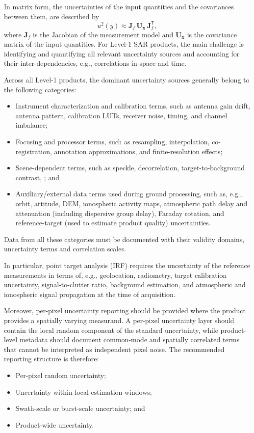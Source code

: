 In matrix form, the uncertainties of the input quantities and the covariances
between them, are described by
\begin{equation}
  u^{2}(y) \approx \mathbf{J}_{f}\, \mathbf{U}_{\mathbf{x}}\,
  \mathbf{J}_{f}^{\mathsf{T}},
  \label{eq:l1_product_generic_cov}
\end{equation}
where $\mathbf{J}_{f}$ is the Jacobian of the measurement model and
$\mathbf{U}_{\mathbf{x}}$ is the covariance matrix of the input quantities.
For Level-1 \ac{SAR} products, the main challenge is identifying and
quantifying all relevant uncertainty sources and accounting for their
inter-dependencies, e.g., correlations in space and time.

Across all Level-1 products, the dominant uncertainty sources generally belong
to the following categories:
\begin{itemize}
  \item Instrument characterization and calibration terms, such as antenna gain
    drift, antenna pattern, calibration \acp{LUT}, receiver noise, timing, and
    channel imbalance;
  \item Focusing and processor terms, such as resampling, interpolation,
    co-registration, annotation approximations, and finite-resolution effects;
  \item Scene-dependent terms, such as speckle, decorrelation,
    target-to-background contrast, ; and
  \item Auxiliary/external data terms used during ground processing, such as,
    e.g., orbit, attitude, \ac{DEM}, ionospheric activity maps, atmospheric
    path delay and attenuation (including dispersive group delay), Faraday
    rotation, and reference-target (used to estimate product quality)
    uncertainties. 
\end{itemize}

Data from all these categories must be documented with their validity domains,
uncertainty terms and correlation scales.

In particular, point target analysis (\ac{IRF}) requires the uncertainty of the
reference measurements in terms of, e.g., geolocation, radiometry, target
calibration uncertainty, signal-to-clutter ratio, background estimation, and
atmospheric and ionospheric signal propagation at the time of acquisition.

Moreover, per-pixel uncertainty reporting should be provided where the product
provides a spatially varying measurand. A per-pixel uncertainty layer should
contain the local random component of the standard uncertainty, while
product-level metadata should document common-mode and spatially correlated
terms that cannot be interpreted as independent pixel noise. The recommended
reporting structure is therefore: 
\begin{itemize}
  \item Per-pixel random uncertainty;
  \item Uncertainty within local estimation windows;
  \item Swath-scale or burst-scale uncertainty; and
  \item Product-wide uncertainty.
\end{itemize}

